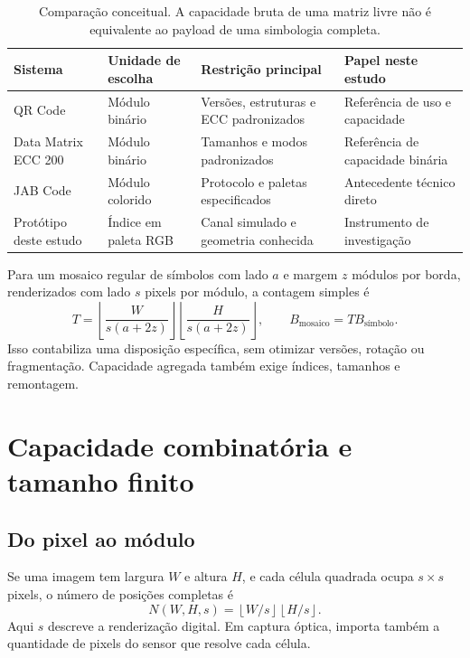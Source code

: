 \documentclass[11pt,a4paper]{article}
\begin{document}
\begin{table}[htbp]
\centering\small
\begin{tabularx}{\linewidth}{lXXX}
\toprule
Sistema & Unidade de escolha & Restrição principal & Papel neste estudo\\
\midrule
QR Code & Módulo binário & Versões, estruturas e ECC padronizados & Referência de uso e capacidade\\
Data Matrix ECC 200 & Módulo binário & Tamanhos e modos padronizados & Referência de capacidade binária\\
JAB Code & Módulo colorido & Protocolo e paletas especificados & Antecedente técnico direto\\
Protótipo deste estudo & Índice em paleta RGB & Canal simulado e geometria conhecida & Instrumento de investigação\\
\bottomrule
\end{tabularx}
\caption{Comparação conceitual. A capacidade bruta de uma matriz livre não é equivalente ao payload de uma simbologia completa.}
\end{table}

Para um mosaico regular de símbolos com lado $a$ e margem $z$ módulos por borda, renderizados com lado $s$ pixels por módulo, a contagem simples é
\begin{equation}
T=\left\lfloor\frac{W}{s(a+2z)}\right\rfloor
\left\lfloor\frac{H}{s(a+2z)}\right\rfloor,\qquad B_{\mathrm{mosaico}}=T B_{\text{símbolo}}.
\end{equation}
Isso contabiliza uma disposição específica, sem otimizar versões, rotação ou fragmentação. Capacidade agregada também exige índices, tamanhos e remontagem.

\section{Capacidade combinatória e tamanho finito}
\subsection{Do pixel ao módulo}
Se uma imagem tem largura $W$ e altura $H$, e cada célula quadrada ocupa $s\times s$ pixels, o número de posições completas é
\begin{equation}\label{eq:ncells}
N(W,H,s)=\left\lfloor W/s\right\rfloor\left\lfloor H/s\right\rfloor.
\end{equation}
Aqui $s$ descreve a renderização digital. Em captura óptica, importa também a quantidade de pixels do sensor que resolve cada célula.
\end{document}
